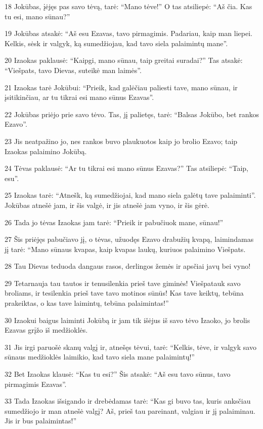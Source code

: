 \par 18 Jokūbas, įėjęs pas savo tėvą, tarė: “Mano tėve!” O tas atsiliepė: “Aš čia. Kas tu esi, mano sūnau?” 
\par 19 Jokūbas atsakė: “Aš esu Ezavas, tavo pirmagimis. Padariau, kaip man liepei. Kelkis, sėsk ir valgyk, ką sumedžiojau, kad tavo siela palaimintų mane”. 
\par 20 Izaokas paklausė: “Kaipgi, mano sūnau, taip greitai suradai?” Tas atsakė: “Viešpats, tavo Dievas, suteikė man laimės”. 
\par 21 Izaokas tarė Jokūbui: “Prieik, kad galėčiau paliesti tave, mano sūnau, ir įsitikinčiau, ar tu tikrai esi mano sūnus Ezavas”. 
\par 22 Jokūbas priėjo prie savo tėvo. Tas, jį palietęs, tarė: “Balsas Jokūbo, bet rankos Ezavo”. 
\par 23 Jis neatpažino jo, nes rankos buvo plaukuotos kaip jo brolio Ezavo; taip Izaokas palaimino Jokūbą. 
\par 24 Tėvas paklausė: “Ar tu tikrai esi mano sūnus Ezavas?” Tas atsiliepė: “Taip, esu”. 
\par 25 Izaokas tarė: “Atnešk, ką sumedžiojai, kad mano siela galėtų tave palaiminti”. Jokūbas atnešė jam, ir šis valgė, ir jis atnešė jam vyno, ir šis gėrė. 
\par 26 Tada jo tėvas Izaokas jam tarė: “Prieik ir pabučiuok mane, sūnau!” 
\par 27 Šis priėjęs pabučiavo jį, o tėvas, užuodęs Ezavo drabužių kvapą, laimindamas jį tarė: “Mano sūnaus kvapas, kaip kvapas laukų, kuriuos palaimino Viešpats. 
\par 28 Tau Dievas teduoda dangaus rasos, derlingos žemės ir apsčiai javų bei vyno! 
\par 29 Tetarnauja tau tautos ir tenusilenkia prieš tave giminės! Viešpatauk savo broliams, ir tesilenkia prieš tave tavo motinos sūnūs! Kas tave keiktų, tebūna prakeiktas, o kas tave laimintų, tebūna palaimintas!” 
\par 30 Izaokui baigus laiminti Jokūbą ir jam tik išėjus iš savo tėvo Izaoko, jo brolis Ezavas grįžo iš medžioklės. 
\par 31 Jis irgi paruošė skanų valgį ir, atnešęs tėvui, tarė: “Kelkis, tėve, ir valgyk savo sūnaus medžioklės laimikio, kad tavo siela mane palaimintų!” 
\par 32 Bet Izaokas klausė: “Kas tu esi?” Šis atsakė: “Aš esu tavo sūnus, tavo pirmagimis Ezavas”. 
\par 33 Tada Izaokas išsigando ir drebėdamas tarė: “Kas gi buvo tas, kuris anksčiau sumedžiojo ir man atnešė valgį? Aš, prieš tau pareinant, valgiau ir jį palaiminau. Jis ir bus palaimintas!” 
